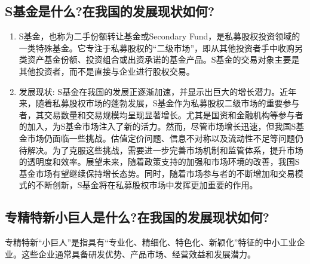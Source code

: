 \documentclass{article}
\begin{document}
\subsection{S基金是什么?在我国的发展现状如何?}

\begin{enumerate}
	\item S基金，也称为二手份额转让基金或Secondary Fund，是私募股权投资领域的一类特殊基金。它专注于私募股权的“二级市场”，即从其他投资者手中收购另类资产基金份额、投资组合或出资承诺的基金产品。S基金的交易对象主要是其他投资者，而不是直接与企业进行股权交易。
  
	\item 发展现状:
S基金在我国的发展正逐渐加速，并显示出巨大的增长潜力。近年来，随着私募股权市场的蓬勃发展，S基金作为私募股权二级市场的重要参与者，其交易数量和交易规模均呈现显著增长。尤其是国资和金融机构等参与者的加入，为S基金市场注入了新的活力。然而，尽管市场增长迅速，但我国S基金市场仍面临一些挑战。估值定价问题、信息不对称以及流动性不足等问题仍待解决。为了克服这些挑战，需要进一步完善市场机制和监管体系，提升市场的透明度和效率。展望未来，随着政策支持的加强和市场环境的改善，我国S基金市场有望继续保持增长态势。同时，随着市场参与者的不断增加和交易模式的不断创新，S基金将在私募股权市场中发挥更加重要的作用。
\end{enumerate}

\subsection{专精特新小巨人是什么?在我国的发展现状如何?}

专精特新“小巨人”是指具有“专业化、精细化、特色化、新颖化”特征的中小工业企业。这些企业通常具备研发优势、产品市场、经营效益和发展潜力。
\end{document}
